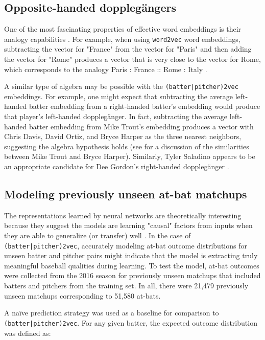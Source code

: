 \documentclass{article}
\begin{document}
\subsection{Opposite-handed dopplegängers}

One of the most fascinating properties of effective word embeddings is their analogy capabilities \parencite{Mikolov2013a}. For example, when using \texttt{word2vec} word embeddings, subtracting the vector for "France" from the vector for "Paris" and then adding the vector for "Rome" produces a vector that is very close to the vector for Rome, which corresponds to the analogy Paris : France :: Rome : Italy \parencite{Mikolov2013a}.

A similar type of algebra may be possible with the \texttt{(batter|pitcher)2vec} embeddings. For example, one might expect that subtracting the average left-handed batter embedding from a right-handed batter's embedding would produce that player's left-handed dopplegänger. In fact, subtracting the average left-handed batter embedding from Mike Trout's embedding produces a vector with Chris Davis, David Ortiz, and Bryce Harper as the three nearest neighbors, suggesting the algebra hypothesis holds (see \parencite{Spector2016} for a discussion of the similarities between Mike Trout and Bryce Harper). Similarly, Tyler Saladino appears to be an appropriate candidate for Dee Gordon's right-handed dopplegänger \parencite{Chamberlain2017}.

\subsection{Modeling previously unseen at-bat matchups}

The representations learned by neural networks are theoretically interesting because they suggest the models are learning "causal" factors from inputs when they are able to generalize (or transfer) well \parencite{RepresentationLearning}. In the case of \texttt{(batter|pitcher)2vec}, accurately modeling at-bat outcome distributions for unseen batter and pitcher pairs might indicate that the model is extracting truly meaningful baseball qualities during learning. To test the model, at-bat outcomes were collected from the 2016 season for previously unseen matchups that included batters and pitchers from the training set. In all, there were 21,479 previously unseen matchups corresponding to 51,580 at-bats.

A naïve prediction strategy was used as a baseline for comparison to \texttt{(batter|pitcher)2vec}. For any given batter, the expected outcome distribution was defined as:
\end{document}

